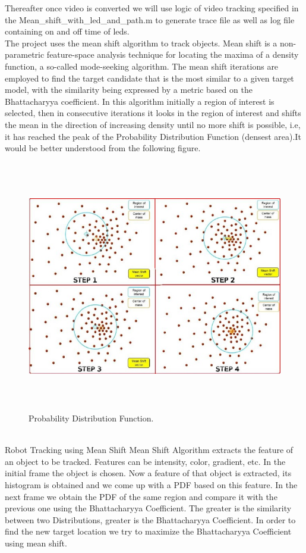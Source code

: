\documentclass[a4paper,12pt,oneside]{book}
\begin{document}
Thereafter once video is converted we will use logic of video tracking specified in the  Mean\_shift\_with\_led\_and\_path.m to generate trace file as well as log file containing on and off time of leds.\\
The project uses the mean shift algorithm to track objects.
Mean shift is a non-parametric feature-space analysis technique for locating the maxima of a density function, a so-called mode-seeking algorithm.
The mean shift iterations are employed to find the target candidate that is the most similar to a given target model, with the similarity being expressed by a metric based on the Bhattacharyya coefficient.
In this algorithm initially a region of interest is selected, then in consecutive iterations it looks in the region of interest and shifts the mean in the direction of increasing density until no more shift is possible, i.e, it has reached the peak of the Probability Distribution Function (densest area).It would be better understood from the following figure.
    \begin{figure}[h!]
		\includegraphics[width=1\linewidth, height=11cm]{ROI.jpg}
		\centering
		\caption{Probability Distribution Function.}
	\end{figure}\\
Robot Tracking using Mean Shift
Mean Shift Algorithm extracts the feature of an object to be tracked. Features can be intensity, color, gradient, etc. In the initial frame the object is chosen. Now a feature of that object is extracted, its histogram is obtained and we come up with a PDF based on this feature. In the next frame we obtain the PDF of the same region and compare it with the previous one using the Bhattacharyya Coefficient. The greater is the similarity between two Distributions, greater is the Bhattacharyya Coefficient. In order to find the new target location we try to maximize the Bhattacharyya Coefficient using mean shift.
\end{document}
